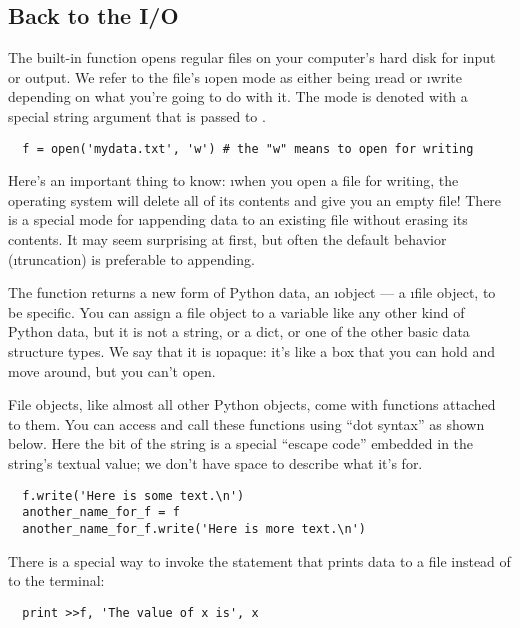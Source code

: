 \documentclass[letterpaper, 12pt, titlepage, twoside]{article}
\begin{document}
\subsection*{Back to the I/O}

The built-in  function opens regular files on your computer's hard
disk for input or output. We refer to the file's \i{open mode} as either being
\i{read} or \i{write} depending on what you're going to do with it. The mode
is denoted with a special string argument that is passed to .

\begin{lstlisting}
  f = open('mydata.txt', 'w') # the "w" means to open for writing
\end{lstlisting}

Here's an important thing to know: \i{when you open a file for writing, the
  operating system will delete all of its contents and give you an empty
  file!} There is a special  mode for \i{appending} data to an existing
file without erasing its contents. It may seem surprising at first, but often
the default behavior (\i{truncation}) is preferable to appending.

The  function returns a new form of Python data, an \i{object} --- a
\i{file object}, to be specific. You can assign a file object to a variable
like any other kind of Python data, but it is not a string, or a dict, or one
of the other basic data structure types. We say that it is \i{opaque}: it's
like a box that you can hold and move around, but you can't open.

File objects, like almost all other Python objects, come with functions
attached to them. You can access and call these functions using ``dot syntax''
as shown below. Here the  bit of the string is a special
``escape code'' embedded in the string's textual value; we don't have space to
describe what it's for.

\begin{lstlisting}
  f.write('Here is some text.\n')
  another_name_for_f = f
  another_name_for_f.write('Here is more text.\n')
\end{lstlisting}

There is a special way to invoke the  statement that prints data to a
file instead of to the terminal:

\begin{lstlisting}
  print >>f, 'The value of x is', x
\end{lstlisting}
\end{document}

